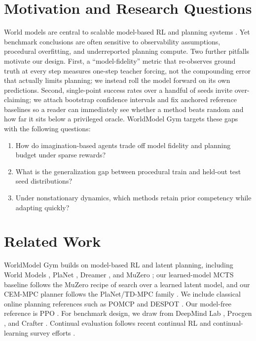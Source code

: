 \documentclass[11pt]{article}
\begin{document}
\section{Motivation and Research Questions}
World models are central to scalable model-based RL and planning systems \citep{ha2018worldmodels,hafner2019planet,hafner2019dreamer,schrittwieser2020muzero,hansen2023tdmpc2}. Yet benchmark conclusions are often sensitive to observability assumptions, procedural overfitting, and underreported planning compute. Two further pitfalls motivate our design. First, a ``model-fidelity'' metric that re-observes ground truth at every step measures one-step teacher forcing, not the compounding error that actually limits planning; we instead roll the model forward on its own predictions. Second, single-point success rates over a handful of seeds invite over-claiming; we attach bootstrap confidence intervals and fix anchored reference baselines so a reader can immediately see whether a method beats random and how far it sits below a privileged oracle. WorldModel Gym targets these gaps with the following questions:
\begin{enumerate}
    \item How do imagination-based agents trade off model fidelity and planning budget under sparse rewards?
    \item What is the generalization gap between procedural train and held-out test seed distributions?
    \item Under nonstationary dynamics, which methods retain prior competency while adapting quickly?
\end{enumerate}

\section{Related Work}
WorldModel Gym builds on model-based RL and latent planning, including World Models \citep{ha2018worldmodels}, PlaNet \citep{hafner2019planet}, Dreamer \citep{hafner2019dreamer}, and MuZero \citep{schrittwieser2020muzero}; our learned-model MCTS baseline follows the MuZero recipe of search over a learned latent model, and our CEM-MPC planner follows the PlaNet/TD-MPC family \citep{hafner2019planet,hansen2023tdmpc2}. We include classical online planning references such as POMCP \citep{silver2010pomcp} and DESPOT \citep{somani2013despot,ye2017despot}. Our model-free reference is PPO \citep{schulman2017ppo}. For benchmark design, we draw from DeepMind Lab \citep{beattie2016dmlab}, Procgen \citep{cobbe2019procgen,cobbe2021ppg}, and Crafter \citep{hafner2021crafter}. Continual evaluation follows recent continual RL and continual-learning survey efforts \citep{pan2025crlsurvey,wang2025continualrlbook,wang2024continualsurvey}.
\end{document}
